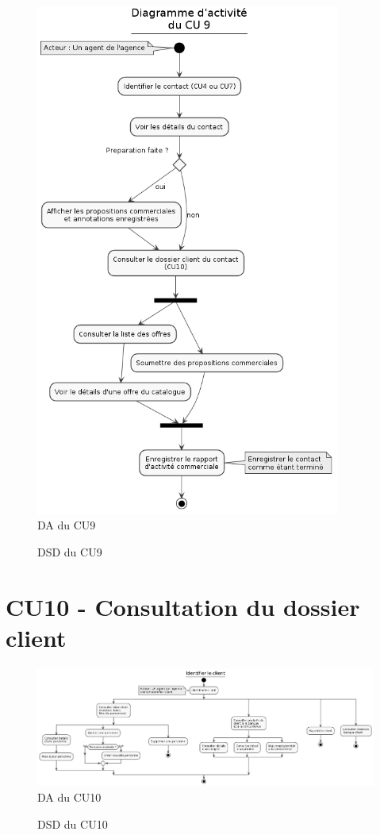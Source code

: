 \begin{figure}[h]
\centering
\includegraphics[width=10cm]{figures/DA_CU9.png}
\caption{DA du CU9}
\end{figure}

\begin{figure}[h]
\centering
\caption{DSD du CU9}
\end{figure}

\clearpage
\section{CU10 - Consultation du dossier client}
\begin{figure}[h]
\centering
\includegraphics[width=18cm, angle=90]{figures/DA_CU10.png}
\caption{DA du CU10}
\end{figure}

\begin{figure}[h]
\centering
\caption{DSD du CU10}
\end{figure}